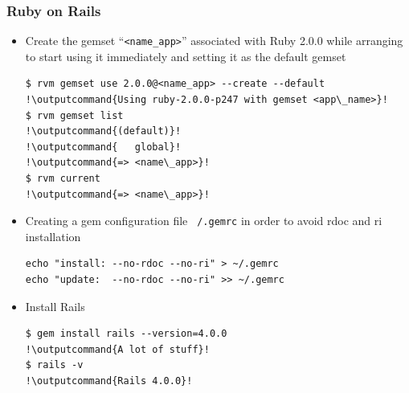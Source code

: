 \documentclass{beamer}
\newcommand{\outputcommand}[1]{\color{darkgreen}{#1}}
\begin{document}
\begin{frame}[fragile]
\frametitle{Ruby on Rails}
\begin{itemize}
\item Create the gemset ``\texttt{<name\_app>}'' associated with Ruby 2.0.0 while arranging to start using it immediately and setting it as the default gemset
\lstset{language=shell, escapechar=!}
\begin{lstlisting}[escapechar=!]
$ rvm gemset use 2.0.0@<name_app> --create --default
!\outputcommand{Using ruby-2.0.0-p247 with gemset <app\_name>}!
$ rvm gemset list
!\outputcommand{(default)}!
!\outputcommand{   global}!
!\outputcommand{=> <name\_app>}!
$ rvm current
!\outputcommand{=> <name\_app>}!
\end{lstlisting}
\item Creating a gem configuration file \texttt{~/.gemrc} in order to avoid rdoc and ri installation

\lstset{language=shell, escapechar=!}
\begin{lstlisting}[escapechar=!]
echo "install: --no-rdoc --no-ri" > ~/.gemrc
echo "update:  --no-rdoc --no-ri" >> ~/.gemrc
\end{lstlisting}
\item Install Rails
\begin{lstlisting}[escapechar=!]
$ gem install rails --version=4.0.0
!\outputcommand{A lot of stuff}!
$ rails -v
!\outputcommand{Rails 4.0.0}!
\end{lstlisting}
\end{itemize}
\end{frame}
\end{document}
